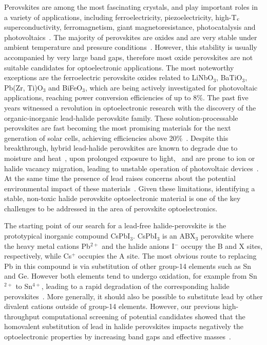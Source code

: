 \documentclass[journal=jpcl,manuscript=letter,layout=traditional]{achemso}
\begin{document}
Perovskites are among the most fascinating crystals, and play important
roles in a variety of applications, including ferroelectricity, piezoelectricity, high-T$_{\rm c}$
superconductivity, ferromagnetism, giant magnetoresistance, photocatalysis and photovoltaics~\cite{Suntivich2011,
Stranks2015, Gratzel2014, Vasala2015,
Grinberg2013, Ramesh2007, Rinjders2005, Ahn2004}. The majority of perovskites are oxides
and are very stable under ambient temperature and pressure conditions~\cite{Vasala2015, Fan2015}.
However, this stability is usually accompanied by very large band gaps, therefore most oxide perovskites
are not suitable candidates for optoelectronic
applications. The most noteworthy exceptions are the ferroelectric perovskite oxides related to LiNbO$_3$,
BaTiO$_3$, Pb(Zr, Ti)O$_3$ and BiFeO$_3$, which are being actively investigated for photovoltaic applications, reaching
power conversion efficiencies of up to 8\%\cite{Fan2015}.
The past five years witnessed a revolution in optoelectronic research with the discovery of the organic-inorganic
lead-halide perovskite family. These solution-processable perovskites are fast becoming the most promising materials
for the next generation of solar cells, achieving efficiencies above 20\%~\cite{Green2014, Lee2012,
Kim2012, NREL}. Despite this breakthrough, hybrid lead-halide perovskites are known to degrade due to moisture and
heat~\cite{Manser2016}, upon prolonged exposure to light,~\cite{Hoke2015} and are prone to ion or halide vacancy migration,
leading to unstable operation of photovoltaic devices~\cite{Eames2015, Meloni2016}. At the same time the presence of lead
raises concerns about the potential environmental impact of these materials~\cite{Espinosa2015, Babagayigit2016}. Given
these limitations, identifying a stable, non-toxic halide perovskite optoelectronic material is one of the key  challenges
to be addressed in the area of perovskite optoelectronics.

The starting point of our search for a lead-free halide-perovskite is the prototypical inorganic compound CsPbI$_3$. CsPbI$_3$
is an ABX$_3$ perovskite where the heavy metal cations Pb$^{2+}$ and the halide anions I$^-$ occupy the B and X sites,
respectively, while Cs$^+$ occupies the A site. The most obvious route to replacing Pb in this compound is via substitution
of other group-14 elements such as Sn and Ge. However both elements tend to undergo oxidation, for example from Sn$^{2+}$
to Sn$^{4+}$, leading to a rapid degradation of the corresponding halide perovskites~\cite{Stoumpos2013, Baikie2013,
Hao2014, Noel2014}. More generally, it should also be possible to substitute lead by other divalent cations outside of
group-14 elements. However, our previous high-throughput computational screening  of potential candidates showed that the
homovalent substitution of lead in halide perovskites impacts negatively the optoelectronic properties by increasing band
gaps and effective masses~\cite{Filip2016}.
\end{document}
